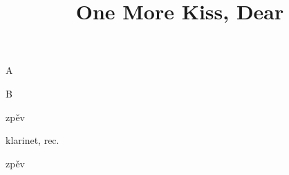 \documentclass[timestamp]{jazzgrid}
\title{\textbf{One More Kiss, Dear}}
\begin{document}
\maketitle
\begin{musicsection}{A}
\barline
	{}
	{\barfour{}{}{}{}{}}
	{}
	{\barfour{}{}{}{}{}}
\barline
	{}
	{\barfour{}{}{}{}{}}
	{}
	{\barfour{}{}{}{}{}}
\barline
	{}
	{}
	{}
	{}
\barline
	{}
	{\barfour{}{}{}{}{}}
	{}
	{\barfour{}{}{}{}{}}
\barline
	{}
	{}
	{}
	{}
\end{musicsection}

\begin{musicsection}{B}
\barline
	{}
	{}
	{}
	{}
\barline
	{}
	{}
	{}
	{}
\end{musicsection}

\begin{multicols*}{2}
\begin{description}[noitemsep,align=right,labelwidth=\widthof{\bfseries{\scriptsize AABA}}]
	\scriptsize
	\item [AABA] zpěv
	\item [A] klarinet, rec.
	\item [A] zpěv
\end{description}

\end{multicols*}
\end{document}
